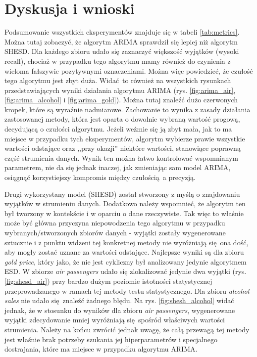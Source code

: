 \documentclass{classrep}
\begin{document}
    \section{Dyskusja i wnioski} {
        Podsumowanie wszystkich eksperymentów znajduje się w tabeli \ref{tab:metrics}. Można tutaj
        zobaczyć, że algorytm ARIMA sprawdził się lepiej niż algorytm SHESD. Dla każdego zbioru
        udało się zaznaczyć większość wyjątków (wysoki recall), chociaż w przypadku tego algorytmu
        mamy również do czynienia z wieloma fałszywie pozytywnymi oznaczeniami. Można więc
        powiedzieć, że czułość tego algorytmu jest zbyt duża. Widać to również na wszystkich
        rysunkach przedstawiających wyniki działania algorytmu ARIMA (rys. \ref{fig:arima_air},
        \ref{fig:arima_alcohol} i \ref{fig:arima_gold}). Można tutaj znaleźć dużo czerwonych kropek,
        które są wyraźnie nadmiarowe. Zachowanie to wynika z zasady działania zastosowanej metody,
        która jest oparta o dowolnie wybraną wartość progową, decydującą o czułości algorytmu.
        Jeżeli weźmie się ją zbyt mała, jak to ma miejsce w przypadku tych eksperymentów, algorytm
        wybierze prawie wszystkie wartości odstające oraz ,,przy okazji'' niektóre wartości,
        stanowiące poprawną część strumienia danych. Wynik ten można łatwo kontrolować wspomnianym
        parametrem, nie da się jednak inaczej, jak zmieniając sam model ARIMA, osiągnąć
        korzystiejszy kompromis między czułością a precyzją.

        Drugi wykorzystany model (SHESD) został stworzony z myślą o znajdowaniu wyjątków w
        strumieniu danych. Dodatkowo należy wspomnieć, że algorytm ten był tworzony w kontekście i w
        oparciu o dane rzeczywiste. Tak więc to właśnie może być główna przyczyna niepowodzenia tego
        algorytmu w przypadku wybranych/stworzonych zbiorów danych - wyjątki zostały wygenerowane
        sztucznie i z punktu widzeni tej konkretnej metody nie wyróżniają się ona dość, aby mogły
        zostać uznane za wartości odstające. Najlepsze wyniki są dla zbioru \textit{gold price},
        który jako, że nie jest cykliczny był analizowany jedynie algorytmem ESD. W zbiorze
        \textit{air passengers} udało się zlokalizować jedynie dwa wyjątki (rys.
        \ref{fig:shesd_air}) przy bardzo dużym poziomie istotności statystycznej przeprowadzanego w
        ramach tej metody testu statystycznego. Dla zbioru \textit{alcohol sales} nie udało
        się znaleźć żadnego błędu. Na rys. \ref{fig:shesh_alcohol} widać jednak, że w stosunku do
        wyników dla zbioru \textit{air passengers}, wygenerowane wyjątki zdecydowanie mniej
        wyróżniają się spośród właściwych wartości strumienia. Należy na końcu zwrócić jednak uwagę,
        że całą przewagą tej metody jest właśnie brak potrzeby szukania jej hiperparametrów i
        specjalnego dostrajania, które ma miejsce w przypadku algorytmu ARIMA.
    }
\end{document}
